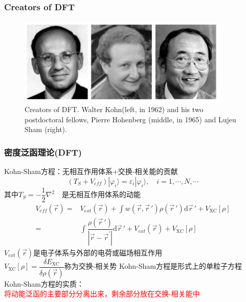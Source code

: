 \frame
{
	\frametitle{\rm{Creators of DFT}}
\begin{figure}[h!]
\vskip 10pt
\centering
\includegraphics[height=1.65in,width=4.0in,viewport=0 0 1562 610,clip]{Figures/Creators_of_DFT.png}
\caption{\tiny \textrm{Creators of DFT. Walter Kohn(left, in 1962) and his two postdoctoral fellows, Pierre Hohenberg (middle, in 1965) and Lujeu Sham (right).}}%
\label{Creator_of_DFT}
\end{figure}
}

\frame                               %
{
\frametitle{密度泛函理论(\textrm{DFT})}
\textrm{Kohn-Sham}方程：无相互作用体系+交换-相关能的贡献
$$(T_S+V_{e\!f\!f})|\varphi_i\rangle=\varepsilon_i|\varphi_i\rangle,\quad i=1,\cdots,N,\cdots$$
其中$T_S=-\dfrac12\nabla^2$~~是无相互作用体系的动能
\begin{displaymath}
	\begin{aligned}
		V_{e\!f\!f}(\vec r)=&V_{ext}(\vec r)+\displaystyle\int w(\vec r,\vec r\,')\rho(\vec r\,')\mathrm{d}\vec r\,'+V_{\mathrm{XC}}[\rho]\\
=&\displaystyle\int\dfrac{\rho(\vec r\,')}{|\vec r-\vec r^{\prime}|}\mathrm{d}\vec r\,'+V_{ext}(\vec r)+V_{\mathrm{XC}}[\rho]
	\end{aligned}
\end{displaymath}
$V_{ext}(\vec r)$是电子体系与外部的电荷或磁场相互作用\\
$V_{\mathrm{XC}}[\rho]=\dfrac{\delta E_{\mathrm{XC}}}{\delta\rho(\vec r)}$称为交换-相关势
\vskip 10pt
\textrm{Kohn-Sham}方程是形式上的单粒子方程
\vskip 6pt
\textrm{Kohn-Sham}方程的实质：\\\textcolor{red}{将动能泛函的主要部分分离出来，剩余部分放在交换-相关能中}
}

